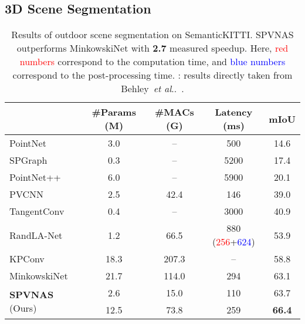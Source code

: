 \documentclass[runningheads]{llncs}
\makeatletter
\DeclareRobustCommand\onedot{\futurelet\@let@token\@onedot}
\def\@onedot{\ifx\@let@token.\else.\null\fi\xspace}
\def\etal{\emph{et al}\onedot}
\def\modelshort{SPVNAS\xspace}
\makeatother
\begin{document}
\subsection{3D Scene Segmentation}

\begin{table}[t]
\setlength{\tabcolsep}{8pt}
\small\centering
\begin{tabular}{lcccc}
    \toprule
     & \#Params (M) & \#MACs (G) & Latency (ms) & mIoU \\
    \midrule
    PointNet~\cite{qi2017pointnet} & 3.0 & -- & 500 & 14.6 \\
    SPGraph~\cite{landrieu2018large} & 0.3 & -- & 5200 & 17.4 \\
    PointNet++~\cite{qi2017pointnet++} & 6.0 & -- & 5900 & 20.1 \\
    PVCNN~\cite{liu2019point} & 2.5 & 42.4 & 146 & 39.0 \\
    TangentConv~\cite{tatarchenko2018tangent} & 0.4 & -- & 3000 & 40.9 \\
    RandLA-Net~\cite{hu2019randla} & 1.2 & 66.5 & 880 (\textcolor{red}{256}+\textcolor{blue}{624}) & 53.9 \\
    KPConv~\cite{thomas2019kpconv} & 18.3 & 207.3 & -- & 58.8 \\
    MinkowskiNet~\cite{choy20194d} & 21.7 & 114.0 & 294 & 63.1 \\
    \midrule
    \multirow{2}{*}{\textbf{\modelshort} (Ours)} & 2.6 & 15.0 & 110 & 63.7 \\
     & 12.5 & 73.8 & 259 & \textbf{66.4} \\
    \bottomrule
\end{tabular}
\caption{Results of outdoor scene segmentation on SemanticKITTI. \modelshort outperforms MinkowskiNet with \textbf{2.7} measured speedup. Here, \textcolor{red}{red numbers} correspond to the computation time, and \textcolor{blue}{blue numbers} correspond to the post-processing time. : results directly taken from Behley~\etal~\cite{behley2019semantickitti}.}
\label{tab:semantickitti:results:3d}
\end{table}
\end{document}
